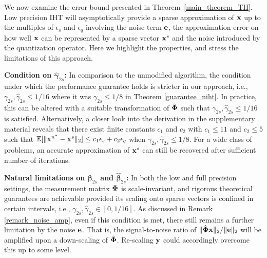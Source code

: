 \documentclass{article}
\begin{document}
We now examine the error bound presented in Theorem~\ref{main_theorem_TH}. Low precision IHT will asymptotically provide a sparse approximation of ${\bf x}$ up to the multiples of $ {\epsilon}_s$ and $ {\epsilon}_q$ involving the noise term ${\bf e}$, the approximation error on how well ${\bf x}$ can be represented by a sparse vector ${\bf x}^s$ and the noise introduced by the quantization operator. 
Here we highlight the properties, and stress the limitations of this approach.

{\bf Condition on $\hat{\boldsymbol{\gamma}}_{2s}$:} In comparison to the unmodified algorithm, the condition under which the performance guarantee holds is stricter in our approach, i.e., ${\gamma}_{2s}, \hat{\gamma}_{2s}\leq 1/16$ where it was ${\gamma}_{2s}\leq 1/8$ in Theorem \ref{guarantee_niht}. In practice, this can be altered with a suitable transformation of $\hat{\bf \Phi}$ such that ${\gamma}_{2s}, \hat{\gamma}_{2s}\leq 1/16$ is satisfied. Alternatively, a closer look into the derivation in the supplementary material reveals that there exist finite constants $c_1$ and $c_2$ with $c_1\leq 11$ and $c_2\leq 5$ such that $\mathbb{E}[\|{\bf x}^{n^*}-{\bf x}^s \|_2] \leq c_1\epsilon_s + c_2\epsilon_q$ when ${\gamma}_{2s}, \hat{\gamma}_{2s}\leq 1/8$. For a wide class of problems, an accurate approximation of ${\bf x}^s$ can still be recovered after sufficient number of iterations.


{\bf Natural limitations on ${\boldsymbol{\beta}}_{2s}$ and $\hat{\boldsymbol{\beta}}_{2s}$:} In both the low and full precision settings, the measurement matrix ${\bf \Phi}$ is scale-invariant, and rigorous theoretical guarantees are achievable provided its scaling onto sparse vectors is confined in certain intervals, i.e., ${\gamma}_{2s}, \hat{\gamma}_{2s}\in [0, 1/16]$. As discussed in Remark \ref{remark_noise_amp}, even if this condition is met, there still remains a further limitation by the noise ${\bf e}$. That is, the signal-to-noise ratio of $\|\hat{\bf \Phi} {\bf x} \|_2/\|{\bf e} \|_2$ will be amplified upon a down-scaling of $\hat{\bf \Phi}$. Re-scaling ${\bf y}$ could accordingly overcome this up to some level. 
\end{document}
